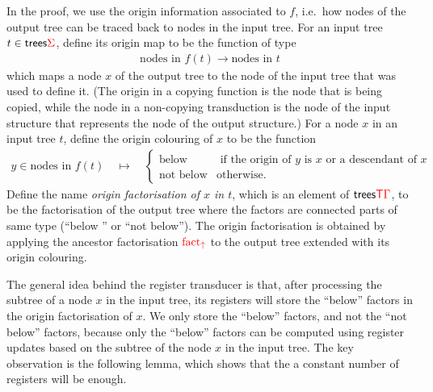 \newcommand{\origin}[1]{\mathrm{origin}_{#1}}
\newcommand{\orcol}[2]{\mathrm{orcol}_{#1}^{#2}}
In the proof, we use the origin information associated to $f$, i.e.~how nodes of the output tree can be traced back to nodes in the input tree. For an input tree $t \in \mathsf {trees} {\color{red}{\Sigma}}$, define its origin map
to be the function of type
\begin{align*}
    \text{nodes in $f(t)$} \to \text{nodes in $t$}
   \end{align*}
which maps a node $x$ of the output tree to the node of the input tree that was used to define it. (The origin in a copying function is the node that is being copied, while the node in a non-copying transduction is the node of the input structure that represents the node of the output structure.) For a node $x$ in an input tree $t$, define the origin colouring of $x$ to be the function 
\begin{align*}
 y \in \text{nodes in $f(t)$} \quad \mapsto \quad  \begin{cases}
    \text{below} & \text{ if the origin of $y$ is $x$ or a descendant of $x$}\\
    \text{not below} & \text{otherwise.}
\end{cases}
\end{align*}
Define  the name \emph{origin factorisation of $x$ in $t$}, which is an element of $\mathsf {trees} {\color{red}{\mathsf T}} {\color{red}{\Gamma}}$, to be the factorisation of  the output tree where the factors are connected parts of same type (``below '' or ``not below''). The origin factorisation is obtained by applying the ancestor factorisation ${\color{red}{\mathrm{fact_{\uparrow}}}}$ to the output tree extended with its  origin colouring. 

The general idea behind the register transducer is that, after processing the subtree of a node $x$ in the input tree, its registers will store the ``below'' factors in the origin factorisation of $x$. We only store the ``below'' factors, and not the ``not below'' factors, because only the ``below'' factors can be computed using register updates based on the subtree of the node $x$ in the input tree. The key observation is the following lemma, which shows that the a constant number of registers will be enough. 




